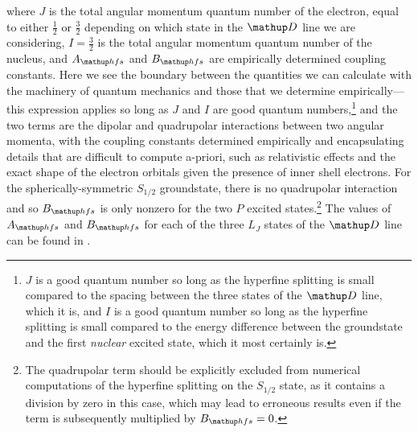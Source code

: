 where $J$ is the total angular momentum quantum number of the electron, equal to either $\frac12$ or $\frac32$ depending on which state in the $\up{D}$ line we are considering, $I=\frac32$ is the total angular momentum quantum number of the nucleus, and $A_\up{hfs}$ and $B_\up{hfs}$ are empirically determined coupling constants. Here we see the boundary between the quantities we can calculate with the machinery of quantum mechanics and those that we determine empirically---this expression applies so long as $J$ and $I$ are good quantum numbers,\footnote{$J$ is a good quantum number so long as the hyperfine splitting is small compared to the spacing between the three states of the $\up{D}$ line, which it is, and $I$ is a good quantum number so long as the hyperfine splitting is small compared to the energy difference between the groundstate and the first \emph{nuclear} excited state, which it most certainly is.} and the two terms are the dipolar and quadrupolar interactions \cite{arimondo_experimental_1977} between two angular momenta, with the coupling constants determined empirically and encapsulating details that are difficult to compute a-priori, such as relativistic effects and the exact shape of the electron orbitals given the presence of inner shell electrons. For the spherically-symmetric $S_{1/2}$ groundstate, there is no quadrupolar interaction and so $B_\up{hfs}$ is only nonzero for the two $P$ excited states.\footnote{The quadrupolar term should be explicitly excluded from numerical computations of the hyperfine splitting on the $S_{1/2}$ state, as it contains a division by zero in this case, which may lead to erroneous results even if the term is subsequently multiplied by $B_\up{hfs}=0$.} The values of $A_\up{hfs}$ and $B_\up{hfs}$ for each of the three $L_J$ states of the $\up{D}$ line can be found in \cite{steck_rubidium_2015}.


